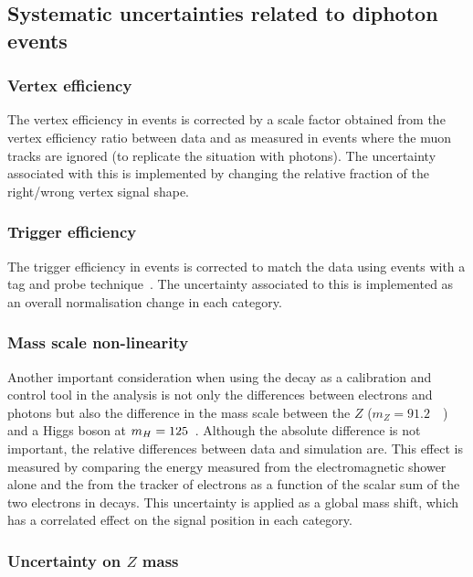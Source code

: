 \subsection{Systematic uncertainties related to diphoton events}

\subsubsection{Vertex efficiency}

The vertex efficiency in \MC events is corrected by a scale factor obtained from the vertex efficiency ratio between data and \MC as measured in \Zmumu events where the muon tracks are ignored (to replicate the situation with photons). The uncertainty associated with this is implemented by changing the relative fraction of the right/wrong vertex signal shape. 

\subsubsection{Trigger efficiency}

The trigger efficiency in \MC events is corrected to match the data using \Zee events with a tag and probe technique~\cite{tag_and_probe}. The uncertainty associated to this is implemented as an overall normalisation change in each category.

\subsubsection{Mass scale non-linearity}

Another important consideration when using the \Zee decay as a calibration and control tool in the analysis is not only the differences between electrons and photons but also the difference in the mass scale between the $Z$ ($m_{Z}=91.2$~\GeV~\cite{pdg}) and a Higgs boson at $m_{H}=125$~\GeV. Although the absolute difference is not important, the relative differences between data and \MC simulation are. This effect is measured by comparing the energy measured from the electromagnetic shower alone and the \pT from the tracker of electrons as a function of the scalar \ET sum of the two electrons in \Zee decays. This uncertainty is applied as a global mass shift,  which has a correlated effect on the signal position in each category.

\subsubsection{Uncertainty on $Z$ mass}

